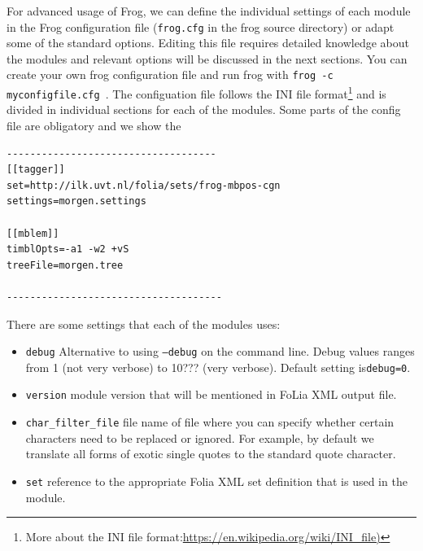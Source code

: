 \documentclass{book}
\begin{document}
For advanced usage of Frog, we can define the individual settings of each
module in the Frog configuration file ({\tt frog.cfg} in the frog source directory) or adapt some of the standard options. Editing this file requires detailed knowledge about the modules and relevant options will be discussed in the next sections. You can create your own frog configuration file and run frog with {\tt frog -c myconfigfile.cfg }.
The configuation file follows the INI file format\footnote{More about the INI file format:\url{https://en.wikipedia.org/wiki/INI_file)}} and is divided in individual sections for each of the modules. Some parts of the config file are obligatory and we show the

\begin{verbatim}
------------------------------------
[[tagger]]
set=http://ilk.uvt.nl/folia/sets/frog-mbpos-cgn
settings=morgen.settings

[[mblem]]
timblOpts=-a1 -w2 +vS
treeFile=morgen.tree

-------------------------------------
\end{verbatim}

There are some settings that each of the modules uses:

\begin{itemize}
\item {\tt debug} Alternative to using {\tt --debug} on the command line. Debug values ranges from 1 (not very verbose) to 10??? (very verbose). Default setting is{\tt debug=0}. %

\item {\tt version} module version that will be mentioned in FoLia XML output file.

\item {\tt char\_filter\_file} file name of file where you can specify whether certain characters need to be replaced or ignored. For example, by default we translate all forms of exotic single quotes to the standard quote character.

\item {\tt set} reference to the appropriate Folia XML set definition that is used in the module.
\end{itemize}
\end{document}
